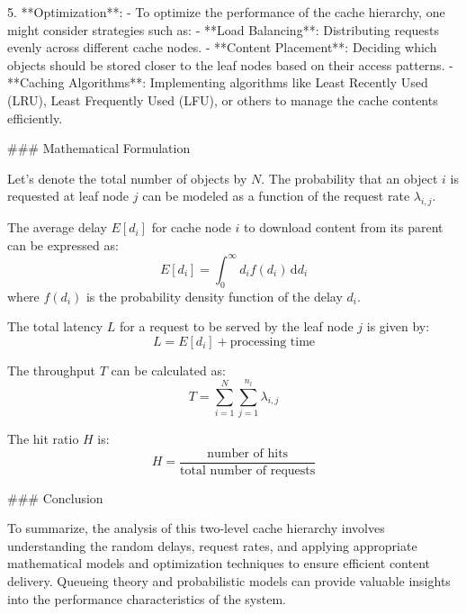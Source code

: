 5. **Optimization**:
   - To optimize the performance of the cache hierarchy, one might consider strategies such as:
     - **Load Balancing**: Distributing requests evenly across different cache nodes.
     - **Content Placement**: Deciding which objects should be stored closer to the leaf nodes based on their access patterns.
     - **Caching Algorithms**: Implementing algorithms like Least Recently Used (LRU), Least Frequently Used (LFU), or others to manage the cache contents efficiently.

### Mathematical Formulation

Let's denote the total number of objects by \( N \). The probability that an object \( i \) is requested at leaf node \( j \) can be modeled as a function of the request rate \( \lambda_{i,j} \).

The average delay \( E[d_i] \) for cache node \( i \) to download content from its parent can be expressed as:
\[ E[d_i] = \int_0^\infty d_i f(d_i) \, \mathrm{d}d_i \]
where \( f(d_i) \) is the probability density function of the delay \( d_i \).

The total latency \( L \) for a request to be served by the leaf node \( j \) is given by:
\[ L = E[d_i] + \text{processing time} \]

The throughput \( T \) can be calculated as:
\[ T = \sum_{i=1}^N \sum_{j=1}^{n_l} \lambda_{i,j} \]

The hit ratio \( H \) is:
\[ H = \frac{\text{number of hits}}{\text{total number of requests}} \]

### Conclusion

To summarize, the analysis of this two-level cache hierarchy involves understanding the random delays, request rates, and applying appropriate mathematical models and optimization techniques to ensure efficient content delivery. Queueing theory and probabilistic models can provide valuable insights into the performance characteristics of the system.